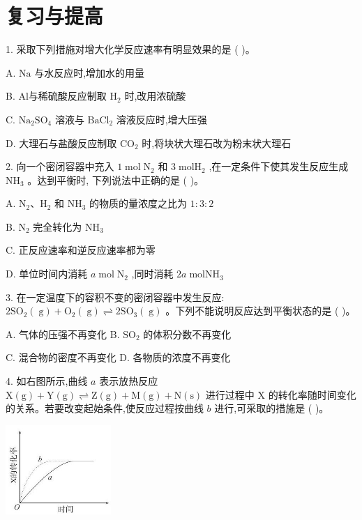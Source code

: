 \documentclass[10pt]{article}
\begin{document}
\section*{复习与提高}

1. 采取下列措施对增大化学反应速率有明显效果的是 ( )。

A. \(\mathrm{{Na}}\) 与水反应时,增加水的用量

B. Al与稀硫酸反应制取 \({\mathrm{H}}_{2}\) 时,改用浓硫酸

C. \({\mathrm{{Na}}}_{2}{\mathrm{{SO}}}_{4}\) 溶液与 \({\mathrm{{BaCl}}}_{2}\) 溶液反应时,增大压强

D. 大理石与盐酸反应制取 \({\mathrm{{CO}}}_{2}\) 时,将块状大理石改为粉末状大理石

2. 向一个密闭容器中充入 \(1\mathrm{\;{mol}}{\mathrm{\;N}}_{2}\) 和 \(3\mathrm{\;{mol}}{\mathrm{H}}_{2}\) ,在一定条件下使其发生反应生成 \({\mathrm{{NH}}}_{3}\) 。达到平衡时, 下列说法中正确的是 ( )。

A. \({\mathrm{N}}_{2}\text{、}{\mathrm{H}}_{2}\) 和 \({\mathrm{{NH}}}_{3}\) 的物质的量浓度之比为 \(1 : 3 : 2\)

B. \({\mathrm{N}}_{2}\) 完全转化为 \({\mathrm{{NH}}}_{3}\)

C. 正反应速率和逆反应速率都为零

D. 单位时间内消耗 \(a\mathrm{\;{mol}}{\mathrm{\;N}}_{2}\) ,同时消耗 \({2a}\mathrm{\;{mol}}{\mathrm{{NH}}}_{3}\)

3. 在一定温度下的容积不变的密闭容器中发生反应: \(2{\mathrm{{SO}}}_{2}\left( \mathrm{\;g}\right) + {\mathrm{O}}_{2}\left( \mathrm{\;g}\right) \rightleftharpoons 2{\mathrm{{SO}}}_{3}\left( \mathrm{\;g}\right)\) 。下列不能说明反应达到平衡状态的是 ( )。

A. 气体的压强不再变化 B. \({\mathrm{{SO}}}_{2}\) 的体积分数不再变化

C. 混合物的密度不再变化 D. 各物质的浓度不再变化

4. 如右图所示,曲线 \(a\) 表示放热反应 \(\mathrm{X}\left( \mathrm{g}\right) + \mathrm{Y}\left( \mathrm{g}\right) \rightleftharpoons \mathrm{Z}\left( \mathrm{g}\right) + \mathrm{M}\left( \mathrm{g}\right) + \mathrm{N}\left( \mathrm{s}\right)\) 进行过程中 \(\mathrm{X}\) 的转化率随时间变化的关系。若要改变起始条件,使反应过程按曲线 \(b\) 进行,可采取的措施是 ( )。

\begin{center}
\includegraphics[max width=0.3\textwidth]{images/0190da9d-8bfd-732f-bc2c-0b21d0f13b91_58_867495.jpg}
\end{center}
\end{document}
